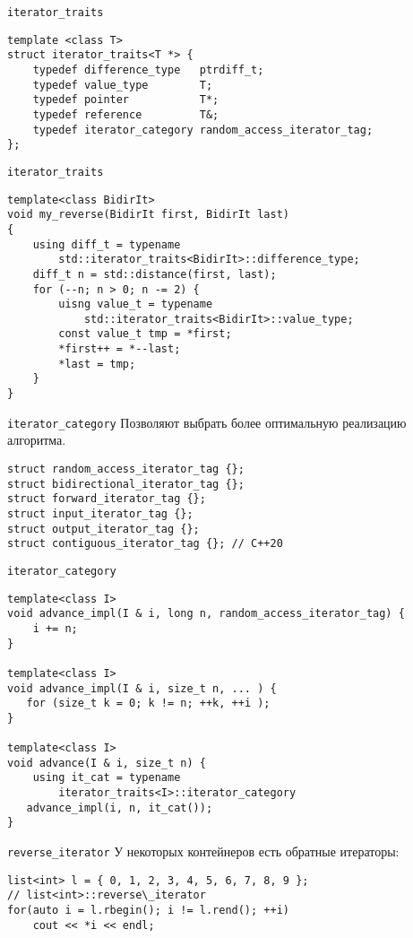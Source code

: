 \documentclass{beamer}
\begin{document}
\begin{frame}[fragile]{{\tt iterator\_traits}}
\begin{lstlisting}
template <class T>
struct iterator_traits<T *> {
    typedef difference_type   ptrdiff_t;
    typedef value_type        T;
    typedef pointer           T*;
    typedef reference         T&;
    typedef iterator_category random_access_iterator_tag;
};
\end{lstlisting}
\end{frame}

\begin{frame}[fragile]{{\tt iterator\_traits}}
\begin{lstlisting}
template<class BidirIt>
void my_reverse(BidirIt first, BidirIt last)
{
    using diff_t = typename 
        std::iterator_traits<BidirIt>::difference_type;
    diff_t n = std::distance(first, last);
    for (--n; n > 0; n -= 2) {
        uisng value_t = typename 
            std::iterator_traits<BidirIt>::value_type;
        const value_t tmp = *first;
        *first++ = *--last;
        *last = tmp;
    }
}
\end{lstlisting}
\end{frame}
 
\begin{frame}[fragile]{{\tt iterator\_category}}
    Позволяют выбрать более оптимальную реализацию алгоритма.
\begin{lstlisting}
struct random_access_iterator_tag {};
struct bidirectional_iterator_tag {};
struct forward_iterator_tag {};
struct input_iterator_tag {};
struct output_iterator_tag {};
struct contiguous_iterator_tag {}; // C++20
\end{lstlisting}
\end{frame}

\begin{frame}[fragile]{{\tt iterator\_category}}
\begin{lstlisting}
template<class I>
void advance_impl(I & i, long n, random_access_iterator_tag) { 
    i += n; 
}

template<class I>
void advance_impl(I & i, size_t n, ... ) { 
   for (size_t k = 0; k != n; ++k, ++i );
}

template<class I>
void advance(I & i, size_t n) {
    using it_cat = typename 
        iterator_traits<I>::iterator_category
   advance_impl(i, n, it_cat());
}
\end{lstlisting}
\end{frame}

\begin{frame}[fragile]{{\tt reverse\_iterator}}
    У некоторых контейнеров есть обратные итераторы: 
\begin{lstlisting}
list<int> l = { 0, 1, 2, 3, 4, 5, 6, 7, 8, 9 }; 
// list<int>::reverse\_iterator
for(auto i = l.rbegin(); i != l.rend(); ++i)
    cout << *i << endl;
\end{lstlisting}
\end{frame}
\end{document}
